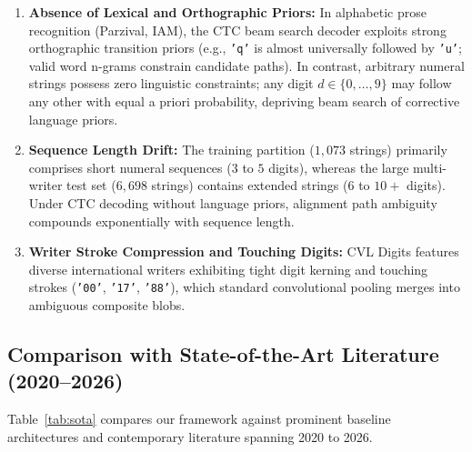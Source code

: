 \documentclass{IEEEtran}
\begin{document}
\begin{enumerate}

    \item \textbf{Absence of Lexical and Orthographic Priors:} In alphabetic prose recognition (Parzival, IAM), the CTC beam search decoder exploits strong orthographic transition priors (e.g., \texttt{'q'} is almost universally followed by \texttt{'u'}; valid word n-grams constrain candidate paths). In contrast, arbitrary numeral strings possess zero linguistic constraints; any digit $d \in \{0, \ldots, 9\}$ may follow any other with equal a priori probability, depriving beam search of corrective language priors.

    \item \textbf{Sequence Length Drift:} The training partition ($1,073$ strings) primarily comprises short numeral sequences ($3$ to $5$ digits), whereas the large multi-writer test set ($6,698$ strings) contains extended strings ($6$ to $10+$ digits). Under CTC decoding without language priors, alignment path ambiguity compounds exponentially with sequence length.

    \item \textbf{Writer Stroke Compression and Touching Digits:} CVL Digits features diverse international writers exhibiting tight digit kerning and touching strokes (\texttt{'00'}, \texttt{'17'}, \texttt{'88'}), which standard convolutional pooling merges into ambiguous composite blobs.

\end{enumerate}

\subsection{Comparison with State-of-the-Art Literature (2020--2026)}

Table~\ref{tab:sota} compares our framework against prominent baseline architectures and contemporary literature spanning 2020 to 2026.
\end{document}
